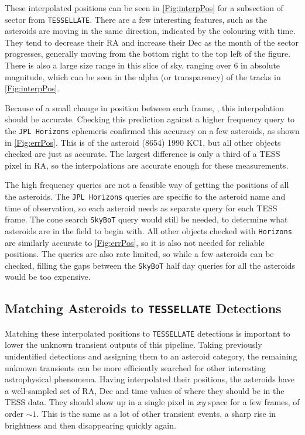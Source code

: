 \documentclass{UCreport}
\begin{document}
These interpolated positions can be seen in \autoref{Fig:interpPos} for a subsection of sector from \texttt{TESSELLATE}.
There are a few interesting features, such as the asteroids are moving in the same direction, indicated by the colouring with time.
They tend to decrease their RA and increase their Dec as the month of the sector progresses, generally moving from the bottom right to the top left of the figure.
There is also a large size range in this slice of sky, ranging over \qty{6}{\mag} in absolute magnitude, which can be seen in the alpha (or transparency) of the tracks in \autoref{Fig:interpPos}.

Because of a small change in position between each frame, \citep[$\sim \qty{1}{\px}$ per \qty{30}{min} FFI][]{Pal2018}, this interpolation should be accurate.
Checking this prediction against a higher frequency query to the \texttt{JPL Horizons} ephemeris confirmed this accuracy on a few asteroids, as shown in \autoref{Fig:errPos}.
This is of the asteroid (8654) 1990 KC1, but all other objects checked are just as accurate.
The largest difference is only a third of a TESS pixel in RA, so the interpolations are accurate enough for these measurements.

The high frequency queries are not a feasible way of getting the positions of all the asteroids.
The \texttt{JPL Horizons} queries are specific to the asteroid name and time of observation, so each asteroid needs as separate query for each TESS frame.
The cone search \texttt{SkyBoT} query would still be needed, to determine what asteroids are in the field to begin with.
All other objects checked with \texttt{Horizons} are similarly accurate to \autoref{Fig:errPos}, so it is also not needed for reliable positions.
The queries are also rate limited, so while a few asteroids can be checked, filling the gaps between the \texttt{SkyBoT} half day queries for all the asteroids would be too expensive.


\subsection{Matching Asteroids to \texttt{TESSELLATE} Detections}\label{SubSec:Match}

Matching these interpolated positions to \texttt{TESSELLATE} detections is important to lower the unknown transient outputs of this pipeline.
Taking previously unidentified detections and assigning them to an asteroid category, the remaining unknown transients can be more efficiently searched for other interesting astrophysical phenomena.
Having interpolated their positions, the asteroids have a well-sampled set of RA, Dec and time values of where they should be in the TESS data.
They should show up in a single pixel in $xy$ space for a few frames, of order $\sim1$.
This is the same as a lot of other transient events, a sharp rise in brightness and then disappearing quickly again.
\end{document}
